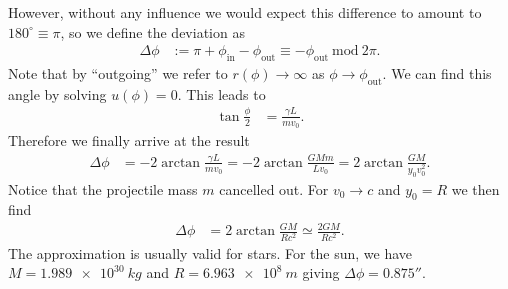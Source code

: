 \documentclass[english, parskip=full]{scrartcl}
\newcommand{\tecxt}{}
\begin{document}
However, without any influence we would expect this difference to amount to $180^\circ \equiv \pi$, so we define the deviation as
\begin{align}
\Delta \phi &:= \pi + \phi_\tecxt\text{in} - \phi_\tecxt\text{out} \equiv -\phi_\tecxt\text{out}\ \tecxt\text{mod}\ 2\pi.
\end{align}
Note that by ``outgoing'' we refer to $r(\phi) \rightarrow \infty$ as $\phi\rightarrow\phi_\tecxt\text{out}$.
We can find this angle by solving $u(\phi) = 0$.
This leads to
\begin{align}
\tan\frac{\phi}{2} &= \frac{\gamma L}{mv_0}.
\end{align}
Therefore we finally arrive at the result
\begin{align}
\Delta\phi &= -2\arctan \frac{\gamma L}{mv_0} = -2\arctan
\frac{GMm}{Lv_0} = 2\arctan\frac{GM}{y_0v_0^2}. \label{eqn:newtonian trajectory deflection angle}
\end{align}
Notice that the projectile mass $m$ cancelled out.
For $v_0\rightarrow c$ and $y_0 = R$ we then find
\begin{align}
\Delta\phi &= 2\arctan\frac{GM}{Rc^2} \simeq \frac{2GM}{Rc^2}.
\end{align}
The approximation is usually valid for stars.
For the sun, we have $M=\SI{1.989e30}{kg}$ and $R=\SI{6.963e8}{m}$ giving $\Delta\phi = 0.875''$.


\end{document}
